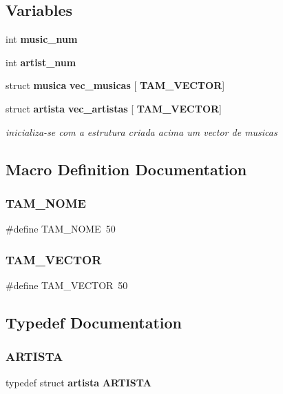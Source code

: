 \subsection*{Variables}
\begin{DoxyCompactItemize}
\item 
int \textbf{ music\+\_\+num}
\item 
int \textbf{ artist\+\_\+num}
\item 
struct \textbf{ musica} \textbf{ vec\+\_\+musicas} [\textbf{ T\+A\+M\+\_\+\+V\+E\+C\+T\+OR}]
\item 
struct \textbf{ artista} \textbf{ vec\+\_\+artistas} [\textbf{ T\+A\+M\+\_\+\+V\+E\+C\+T\+OR}]
\begin{DoxyCompactList}\small\item\em inicializa-\/se com a estrutura criada acima um vector de musicas \end{DoxyCompactList}\end{DoxyCompactItemize}


\subsection{Macro Definition Documentation}
\mbox{\label{project_8h_ad0e480e07eae04b077948c75deb75422}} 
\subsubsection{TAM\_NOME}
{\footnotesize\ttfamily \#define T\+A\+M\+\_\+\+N\+O\+ME~50}

\mbox{\label{project_8h_ae09ba62ef655bddf3ff4678f8d3a7d26}} 
\subsubsection{TAM\_VECTOR}
{\footnotesize\ttfamily \#define T\+A\+M\+\_\+\+V\+E\+C\+T\+OR~50}



\subsection{Typedef Documentation}
\mbox{\label{project_8h_a8f88f8ad560381cf6e92b1ff3ca5efb2}} 
\subsubsection{ARTISTA}
{\footnotesize\ttfamily typedef struct \textbf{ artista} \textbf{ A\+R\+T\+I\+S\+TA}}



